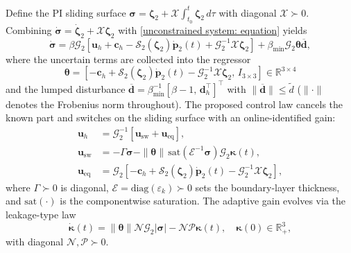 \documentclass{IEEEtaes}
\begin{document}
Define the PI sliding surface $\boldsymbol{\sigma}=\boldsymbol{\zeta}_2+\mathcal{X}\!\int_{t_0}^{t}\boldsymbol{\zeta}_2\,d\tau$ with diagonal $\mathcal{X}\succ 0$. Combining $\dot{\boldsymbol{\sigma}}=\dot{\boldsymbol{\zeta}}_2+\mathcal{X}\boldsymbol{\zeta}_2$ with \eqref{unconstrained system: equation} yields
\begin{equation} \label{sigma derivative: equation 2}
    \dot{\boldsymbol{\sigma}} = \beta\mathcal{G}_2\!\left[\boldsymbol{u}_h+\boldsymbol{c}_h-\mathcal{S}_2(\boldsymbol{\zeta}_2)\dot{\boldsymbol{p}}_2(t)+\mathcal{G}_2^{-1}\mathcal{X}\boldsymbol{\zeta}_2\right] + \beta_{\min}\mathcal{G}_2\boldsymbol{\theta}\boldsymbol{\overline{d}},
\end{equation}
where the uncertain terms are collected into the regressor
\begin{equation} \label{regressor: equation}
    \boldsymbol{\theta} = [-\boldsymbol{c}_h+\mathcal{S}_2(\boldsymbol{\zeta}_2)\dot{\boldsymbol{p}}_2(t)-\mathcal{G}_2^{-1}\mathcal{X}\boldsymbol{\zeta}_2,\,I_{3\times 3}]\in\mathbb{R}^{3\times 4}
\end{equation}
and the lumped disturbance $\boldsymbol{\overline{d}}=\beta_{\min}^{-1}[\beta-1,\,\boldsymbol{d}_h^\top]^\top$ with $\|\boldsymbol{\overline{d}}\|\le\tilde{d}$ ($\|\cdot\|$ denotes the Frobenius norm throughout). The proposed control law cancels the known part and switches on the sliding surface with an online-identified gain:
\begin{align} \label{adaptive control law: equation}
    \boldsymbol{u}_h &= \mathcal{G}_2^{-1}[\boldsymbol{u}_\text{sw}+\boldsymbol{u}_\text{eq}],\nonumber\\
    \boldsymbol{u}_\text{sw} &= -\Gamma\boldsymbol{\sigma} - \|\boldsymbol{\theta}\|\,\text{sat}(\mathcal{E}^{-1}\boldsymbol{\sigma})\mathcal{G}_2\boldsymbol{\kappa}(t),\\
    \boldsymbol{u}_\text{eq} &= \mathcal{G}_2\!\left[-\boldsymbol{c}_h+\mathcal{S}_2(\boldsymbol{\zeta}_2)\dot{\boldsymbol{p}}_2(t)-\mathcal{G}_2^{-1}\mathcal{X}\boldsymbol{\zeta}_2\right],\nonumber
\end{align}
where $\Gamma\succ 0$ is diagonal, $\mathcal{E}=\text{diag}(\varepsilon_k)\succ 0$ sets the boundary-layer thickness, and $\text{sat}(\cdot)$ is the componentwise saturation. The adaptive gain evolves via the leakage-type law
\begin{equation} \label{adaptive law: equation}
    \dot{\boldsymbol{\kappa}}(t) = \|\boldsymbol{\theta}\|\mathcal{N}\mathcal{G}_2|\boldsymbol{\sigma}| - \mathcal{N}\mathcal{P}\boldsymbol{\kappa}(t),\quad\boldsymbol{\kappa}(0)\in\mathbb{R}_+^3,
\end{equation}
with diagonal $\mathcal{N},\mathcal{P}\succ 0$.
\end{document}
